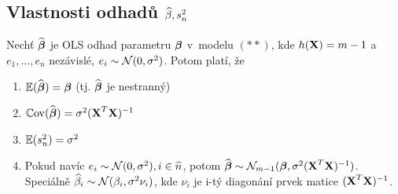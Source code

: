 \subsection{Vlastnosti odhadů $\widehat{\beta}, s_n^2$ }
\begin{theorem}
	Nechť $\widehat{\boldsymbol{\beta}}$ je OLS odhad parametru $\boldsymbol{\beta}$ v~modelu $(**)$, kde $h(\textbf{X}) = m-1$ a~$e_1,..., e_n$ nezávislé, $e_i \sim \mathcal{N}(0,\sigma^2)$. Potom platí, že
	\begin{enumerate}
		\item $\mathbb{E}(\widehat{\boldsymbol{\beta}}) = \boldsymbol{\beta}$ (tj. $\widehat{\boldsymbol{\beta}}$ je nestranný)
		\item $\mathbb{C}\mathrm{ov}(\widehat{\boldsymbol{\beta}}) = \sigma^2 (\textbf{X}^T \textbf{X})^{-1}$
		\item $\mathbb{E}(s_n^2) = \sigma^2$
		\item Pokud navíc $e_i \sim \mathcal{N}(0,\sigma^2), i\in\widehat{n} $, potom $\widehat{\boldsymbol{\beta}} \sim \mathcal{N}_{m-1}(\boldsymbol{\beta}, \sigma^2(\textbf{X}^T \textbf{X})^{-1})$. Speciálně $\widehat{\beta}_i \sim \mathcal{N}(\beta_i, \sigma^2 \nu_i)$, kde $\nu_i$ je i-tý diagonání prvek matice $(\textbf{X}^T \textbf{X})^{-1}$.
	\end{enumerate}
\end{theorem}

